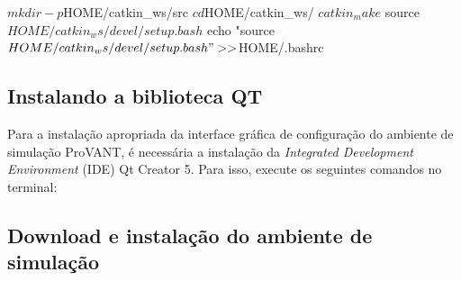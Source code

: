 \begin{bashcode}
$ mkdir -p $HOME/catkin_ws/src
$ cd $HOME/catkin_ws/
$ catkin_make
$ source $HOME/catkin_ws/devel/setup.bash
$ echo "source $HOME/catkin_ws/devel/setup.bash" >> $HOME/.bashrc
\end{bashcode}

\subsection{Instalando a biblioteca QT}




Para a instalação apropriada da interface gráfica de configuração do ambiente de simulação ProVANT, é necessária a instalação da \textit{Integrated Development Environment} (IDE) Qt Creator 5. Para isso, execute os seguintes comandos no terminal: 	

\small
{}
\normalsize


\subsection{Download e instalação do ambiente de simulação}

